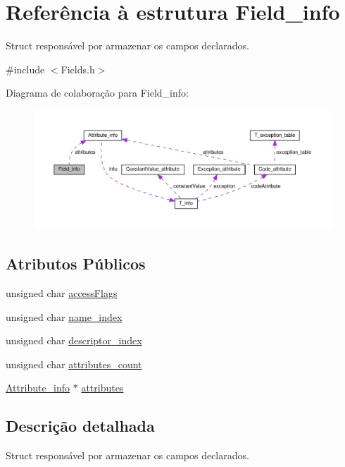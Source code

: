 \hypertarget{structField__info}{}\section{Referência à estrutura Field\+\_\+info}
\label{structField__info}


Struct responsável por armazenar os campos declarados.  




{\ttfamily \#include $<$Fields.\+h$>$}



Diagrama de colaboração para Field\+\_\+info\+:
\nopagebreak
\begin{figure}[H]
\begin{center}
\leavevmode
\includegraphics[width=350pt]{structField__info__coll__graph}
\end{center}
\end{figure}
\subsection*{Atributos Públicos}
\begin{DoxyCompactItemize}
\item 
unsigned char \hyperlink{structField__info_a518c6efb3e5b805d738375e3411bc7b0}{access\+Flags}
\item 
unsigned char \hyperlink{structField__info_af4d468d17e45abb44e879e9c0f0b881d}{name\+\_\+index}
\item 
unsigned char \hyperlink{structField__info_a317d816b6661095bde8c391905385f10}{descriptor\+\_\+index}
\item 
unsigned char \hyperlink{structField__info_a293084dbdbd13fce49fd95edf118db31}{attributes\+\_\+count}
\item 
\hyperlink{structAttribute__info}{Attribute\+\_\+info} $\ast$ \hyperlink{structField__info_a82d5d1b1ba57dfc6b711072777d92894}{attributes}
\end{DoxyCompactItemize}


\subsection{Descrição detalhada}
Struct responsável por armazenar os campos declarados. 

